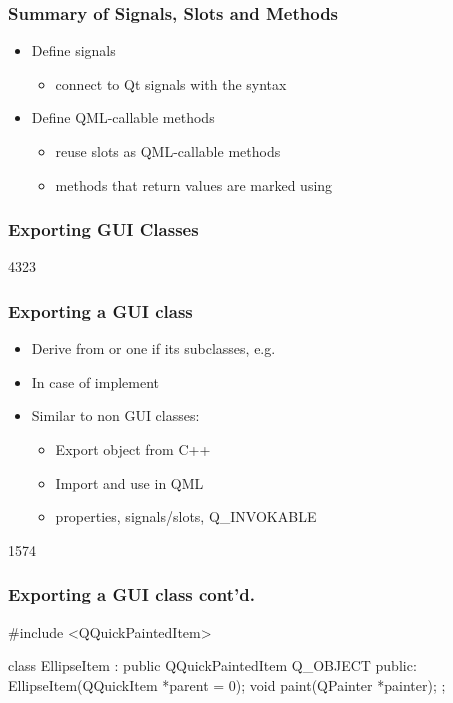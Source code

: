 
\begin{slide}\frametitle{Summary of Signals, Slots and Methods}

\begin{itemize}
\item Define signals
  \begin{itemize}
  \item connect to Qt signals with the  syntax
  \end{itemize}
\item Define QML-callable methods
  \begin{itemize}
  \item reuse slots as QML-callable methods
  \item methods that return values are marked using 
  \end{itemize}
\end{itemize}

\end{slide}


\subsubsection{Exporting GUI Classes}

\begin{slide}{4323}\frametitle{Exporting a GUI class}
  \begin{itemize}
  \item Derive from  or one if its subclasses, e.g. 
  \item In case of  implement 
  \item Similar to non GUI classes:
    \begin{itemize}
    \item Export object from C++
    \item Import and use in QML
    \item properties, signals/slots, Q\_INVOKABLE 
    \end{itemize}
  \end{itemize}
\end{slide}

\begin{slide}[fragile]{1574}\frametitle{Exporting a GUI class cont'd.}

\begin{cpp}
#include <QQuickPaintedItem>

class EllipseItem : public QQuickPaintedItem
{
    Q_OBJECT
public:
    EllipseItem(QQuickItem *parent = 0);
    void paint(QPainter *painter);
};
\end{cpp}
\end{slide}

